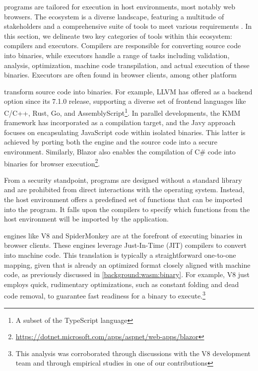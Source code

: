 \Wasm programs are tailored for execution in host environments, most notably web browsers. 
The \Wasm ecosystem is a diverse landscape, featuring a multitude of stakeholders and a comprehensive suite of tools to meet various requirements \cite{Avenger}. 
In this section, we delineate two key categories of tools within this ecosystem: compilers and executors. 
Compilers are responsible for converting source code into \Wasm binaries, while executors handle a range of tasks including validation, analysis, optimization, machine code transpilation, and actual execution of these \Wasm binaries. 
Executors are often found in browser clients, among other platform

 transform source code into \Wasm binaries. 
For example, LLVM has offered \Wasm as a backend option since its 7.1.0 release, supporting a diverse set of frontend languages like C/C++, Rust, Go, and AssemblyScript\footnote{A subset of the TypeScript language}.
In parallel developments, the KMM framework has incorporated \Wasm as a compilation target, and the Javy approach focuses on encapsulating JavaScript code within isolated \Wasm binaries. 
This latter is achieved by porting both the engine and the source code into a secure \Wasm environment. 
Similarly, Blazor also enables the compilation of C# code into \Wasm binaries for browser execution\footnote{\url{https://dotnet.microsoft.com/apps/aspnet/web-apps/blazor}}.

From a security standpoint, \Wasm programs are designed without a standard library and are prohibited from direct interactions with the operating system. Instead, the host environment offers a predefined set of functions that can be imported into the \Wasm program. 
It falls upon the compilers to specify which functions from the host environment will be imported by the \Wasm application.

 engines like V8 and SpiderMonkey are at the forefront of executing \Wasm binaries in browser clients. 
These engines leverage Just-In-Time (JIT) compilers to convert \Wasm into machine code. 
This translation is typically a straightforward one-to-one mapping, given that \Wasm is already an optimized format closely aligned with machine code, as previously discussed in \autoref{background:wasm:binary}. 
For example, V8 just employs quick, rudimentary optimizations, such as constant folding and dead code removal, to guarantee fast readiness for a \wasm binary to execute.\footnote{This analysis was corroborated through discussions with the V8 development team and through empirical studies in one of our contributions\cite{CROW}} 

